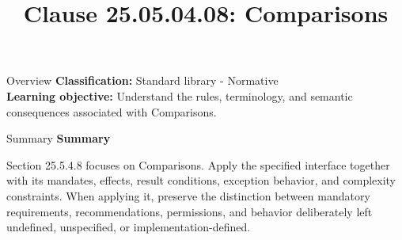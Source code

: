 \documentclass[10pt,letterpaper]{article}
\title{Clause 25.05.04.08: Comparisons}
\author{}
\date{}
\begin{document}
\maketitle
\begin{CornellOverviewBox}{Overview}
\textbf{Classification:} Standard library - Normative\\[2pt]
\textbf{Learning objective:} Understand the rules, terminology, and semantic consequences associated with Comparisons.
\end{CornellOverviewBox}\begin{CornellSummaryBox}{Summary}
{\sffamily\bfseries\color{Accent} Summary}\par\vspace{3pt}Section 25.5.4.8 focuses on Comparisons. Apply the specified interface together with its mandates, effects, result conditions, exception behavior, and complexity constraints. When applying it, preserve the distinction between mandatory requirements, recommendations, permissions, and behavior deliberately left undefined, unspecified, or implementation-defined.
\end{CornellSummaryBox}
\end{document}
